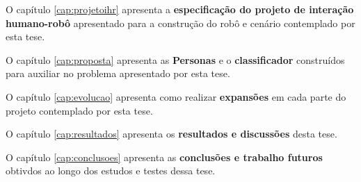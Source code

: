 O capítulo \ref{cap:projetoihr} apresenta a \textbf{especificação do projeto de interação humano-robô} apresentado para a construção do robô e cenário contemplado por esta tese.

O capítulo \ref{cap:proposta} apresenta as \textbf{Personas} e o \textbf{classificador} construídos para auxiliar no problema apresentado por esta tese.

O capítulo \ref{cap:evolucao} apresenta como realizar \textbf{expansões} em cada parte do projeto contemplado por esta tese.

O capítulo \ref{cap:resultados} apresenta os \textbf{resultados e discussões} desta tese.

O capítulo \ref{cap:conclusoes} apresenta as \textbf{conclusões e trabalho futuros} obtivdos ao longo dos estudos e testes dessa tese.
